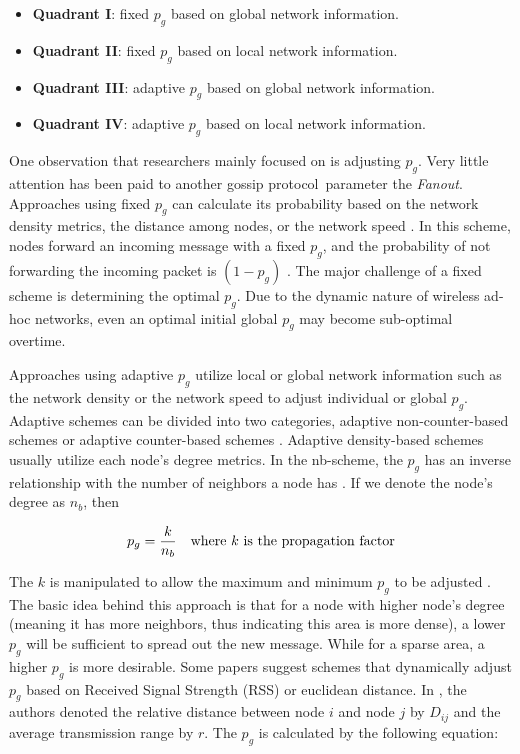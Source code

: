 \documentclass[onehalf,11pt]{beavtex}
\newcommand{\gp}{gossip protocol}
\begin{document}
\begin{itemize}
	\item \textbf{Quadrant I}: fixed $p_g$ based on global network information. 
	\item \textbf{Quadrant II}: fixed $p_g$ based on local network information. 
	\item \textbf{Quadrant III}: adaptive $p_g$ based on global network information. 
	\item \textbf{Quadrant IV}: adaptive $p_g$ based on local network information. 
\end{itemize}

One observation that researchers mainly focused on is adjusting $p_g$. Very little attention has been paid to another \gp ~parameter the \emph{Fanout}. Approaches using fixed $p_g$ can calculate its probability based on the network density metrics, the distance among nodes, or the network speed \cite{2015survey}. In this scheme, nodes forward an incoming message with a fixed $p_g$, and the probability of not forwarding the incoming packet is $(1-p_g)$ \cite{2015survey}. The major challenge of a fixed scheme is determining the optimal $p_g$. Due to the dynamic nature of wireless ad-hoc networks, even an optimal initial global $p_g$ may become sub-optimal overtime. 

Approaches using adaptive $p_g$ utilize local or global network information such as the network density or the network speed to adjust individual or global $p_g$. Adaptive schemes can be divided into two categories, adaptive non-counter-based schemes or adaptive counter-based schemes \cite{2015survey}. Adaptive density-based schemes usually utilize each node's degree metrics. In the nb-scheme, the $p_g$ has an inverse relationship with the number of neighbors a node has \cite{cartigny2003border}. If we denote the node's degree as $n_b$, then 

\[ p_g = \frac{k}{n_b} \mbox{\quad where $k$ is the propagation factor}\]

The $k$ is manipulated to allow the maximum and minimum $p_g$ to be adjusted \cite{cartigny2003border}. The basic idea behind this approach is that for a node with higher node's degree (meaning it has more neighbors, thus indicating this area is more dense), a lower $p_g$ will be sufficient to spread out the new message. While for a sparse area, a higher $p_g$ is more desirable. Some papers \cite{qing2010dynamic}\cite{wisitpongphan2007broadcast} suggest schemes that dynamically adjust $p_g$ based on Received Signal Strength (RSS) or euclidean distance. In \cite{wisitpongphan2007broadcast}, the authors denoted the relative distance between node $i$ and node $j$ by $D_{ij}$ and the average transmission range by $r$. The $p_g$ is calculated by the following equation:
\end{document}

